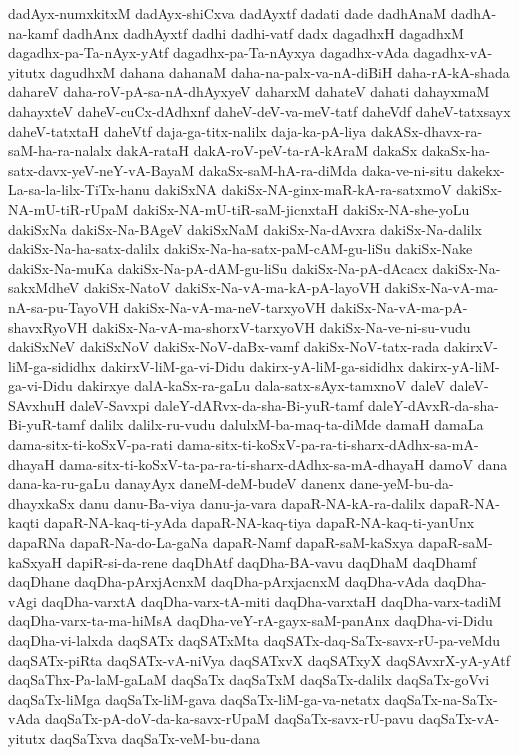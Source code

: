 {dadAyx-numxkitxM
dadAyx-shiCxva
dadAyxtf
dadati
dade
dadhAnaM
dadhA-na-kamf
dadhAnx
dadhAyxtf
dadhi
dadhi-vatf
dadx
dagadhxH
dagadhxM
dagadhx-pa-Ta-nAyx-yAtf
dagadhx-pa-Ta-nAyxya
dagadhx-vAda
dagadhx-vA-yitutx
dagudhxM
dahana
dahanaM
daha-na-palx-va-nA-diBiH
daha-rA-kA-shada
dahareV
daha-roV-pA-sa-nA-dhAyxyeV
daharxM
dahateV
dahati
dahayxmaM
dahayxteV
daheV-cuCx-dAdhxnf
daheV-deV-va-meV-tatf
daheVdf
daheV-tatxsayx
daheV-tatxtaH
daheVtf
daja-ga-titx-nalilx
daja-ka-pA-liya
dakASx-dhavx-ra-saM-ha-ra-nalalx
dakA-rataH
dakA-roV-peV-ta-rA-kAraM
dakaSx
dakaSx-ha-satx-davx-yeV-neY-vA-BayaM
dakaSx-saM-hA-ra-diMda
daka-ve-ni-situ
dakekx-La-sa-la-lilx-TiTx-hanu
dakiSxNA
dakiSx-NA-ginx-maR-kA-ra-satxmoV
dakiSx-NA-mU-tiR-rUpaM
dakiSx-NA-mU-tiR-saM-jicnxtaH
dakiSx-NA-she-yoLu
dakiSxNa
dakiSx-Na-BAgeV
dakiSxNaM
dakiSx-Na-dAvxra
dakiSx-Na-dalilx
dakiSx-Na-ha-satx-dalilx
dakiSx-Na-ha-satx-paM-cAM-gu-liSu
dakiSx-Nake
dakiSx-Na-muKa
dakiSx-Na-pA-dAM-gu-liSu
dakiSx-Na-pA-dAcacx
dakiSx-Na-sakxMdheV
dakiSx-NatoV
dakiSx-Na-vA-ma-kA-pA-layoVH
dakiSx-Na-vA-ma-nA-sa-pu-TayoVH
dakiSx-Na-vA-ma-neV-tarxyoVH
dakiSx-Na-vA-ma-pA-shavxRyoVH
dakiSx-Na-vA-ma-shorxV-tarxyoVH
dakiSx-Na-ve-ni-su-vudu
dakiSxNeV
dakiSxNoV
dakiSx-NoV-daBx-vamf
dakiSx-NoV-tatx-rada
dakirxV-liM-ga-sididhx
dakirxV-liM-ga-vi-Didu
dakirx-yA-liM-ga-sididhx
dakirx-yA-liM-ga-vi-Didu
dakirxye
dalA-kaSx-ra-gaLu
dala-satx-sAyx-tamxnoV
daleV
daleV-SAvxhuH
daleV-Savxpi
daleY-dARvx-da-sha-Bi-yuR-tamf
daleY-dAvxR-da-sha-Bi-yuR-tamf
dalilx
dalilx-ru-vudu
dalulxM-ba-maq-ta-diMde
damaH
damaLa
dama-sitx-ti-koSxV-pa-rati
dama-sitx-ti-koSxV-pa-ra-ti-sharx-dAdhx-sa-mA-dhayaH
dama-sitx-ti-koSxV-ta-pa-ra-ti-sharx-dAdhx-sa-mA-dhayaH
damoV
dana
dana-ka-ru-gaLu
danayAyx
daneM-deM-budeV
danenx
dane-yeM-bu-da-dhayxkaSx
danu
danu-Ba-viya
danu-ja-vara
dapaR-NA-kA-ra-dalilx
dapaR-NA-kaqti
dapaR-NA-kaq-ti-yAda
dapaR-NA-kaq-tiya
dapaR-NA-kaq-ti-yanUnx
dapaRNa
dapaR-Na-do-La-gaNa
dapaR-Namf
dapaR-saM-kaSxya
dapaR-saM-kaSxyaH
dapiR-si-da-rene
daqDhAtf
daqDha-BA-vavu
daqDhaM
daqDhamf
daqDhane
daqDha-pArxjAcnxM
daqDha-pArxjacnxM
daqDha-vAda
daqDha-vAgi
daqDha-varxtA
daqDha-varx-tA-miti
daqDha-varxtaH
daqDha-varx-tadiM
daqDha-varx-ta-ma-hiMsA
daqDha-veY-rA-gayx-saM-panAnx
daqDha-vi-Didu
daqDha-vi-lalxda
daqSATx
daqSATxMta
daqSATx-daq-SaTx-savx-rU-pa-veMdu
daqSATx-piRta
daqSATx-vA-niVya
daqSATxvX
daqSATxyX
daqSAvxrX-yA-yAtf
daqSaThx-Pa-laM-gaLaM
daqSaTx
daqSaTxM
daqSaTx-dalilx
daqSaTx-goVvi
daqSaTx-liMga
daqSaTx-liM-gava
daqSaTx-liM-ga-va-netatx
daqSaTx-na-SaTx-vAda
daqSaTx-pA-doV-da-ka-savx-rUpaM
daqSaTx-savx-rU-pavu
daqSaTx-vA-yitutx
daqSaTxva
daqSaTx-veM-bu-dana
}
